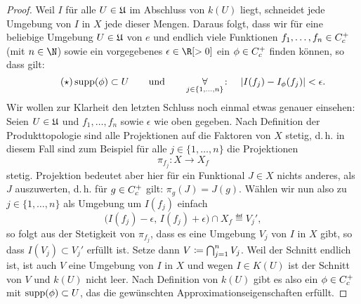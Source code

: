 \begin{proof}
    Weil $I$ für alle $U\in\mathfrak{U}$ im Abschluss von $k(U)$ 
    liegt, schneidet jede Umgebung von $I$ in $X$ jede dieser Mengen.
    Daraus folgt, dass wir für eine beliebige Umgebung $U\in\mathfrak{U}$ von $e$ und
    endlich viele Funktionen $f_1,\ldots,f_n\in C_c^+$ (mit $n\in\N$)
    sowie ein vorgegebenes $\epsilon\in\R[>0]$ ein $\phi\in C_c^+$ finden
    können, so dass gilt:
    \[ \label{pf:existence:ineq} \tag{$\star$}
        \operatorname{supp}(\phi) \subset U \qquad\text{und}\qquad
        \operatorname*{\forall}_{j\in\{1,\ldots,n\}}\colon\quad 
            \lvert I(f_j) - I_\phi(f_j) \rvert < \epsilon
    . \]
    Wir wollen zur Klarheit den letzten Schluss noch einmal etwas genauer
    einsehen: Seien $U\in\mathfrak{U}$ und $f_1,\ldots,f_n$ sowie $\epsilon$ wie oben
    gegeben. Nach Definition der Produkttopologie sind alle Projektionen
    auf die Faktoren von $X$ stetig, d.\,h. in diesem Fall sind zum Beispiel für
    alle $j\in\{1,\ldots,n\}$ die Projektionen
    \[ \pi_{f_j}\colon X \to X_f \]
    stetig. Projektion bedeutet aber hier für ein Funktional $J\in X$ nichts
    anderes, als $J$ auszuwerten, d.\,h. für $g\in C_c^+$ gilt:
    $\pi_g(J) = J(g)$. Wählen wir nun also zu $j\in\{1,\ldots,n\}$ als Umgebung
    um $I(f_j)$ einfach  
    \[
        \bigl( I(f_j)-\epsilon,\, I(f_j)+\epsilon \bigr) \cap X_f \eqdef V_j'
    , \]
    so folgt aus der Stetigkeit von $\pi_{f_j}$, dass es eine Umgebung $V_j$ von
    $I$ in $X$ gibt, so dass $I(V_j) \subset V_j'$ erfüllt ist. Setze dann 
    $V\coloneqq \bigcap_{j=1}^n V_j$. Weil der Schnitt endlich ist, ist auch $V$
    eine Umgebung von $I$ in $X$ und wegen $I\in K(U)$ ist der Schnitt von $V$
    und $k(U)$ nicht leer. Nach Definition von $k(U)$ gibt es also
    ein $\phi\in C_c^+$ mit $\operatorname{supp}(\phi)\subset U$, das die gewünschten
    Approximationseigenschaften erfüllt.
    

\end{proof}
